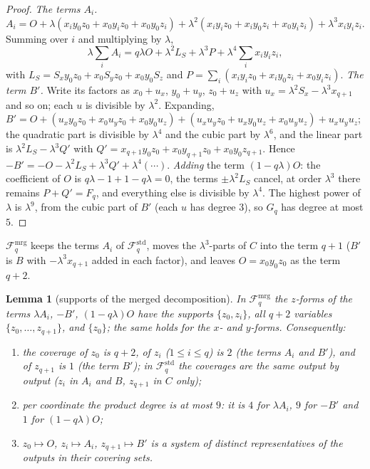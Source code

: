 \documentclass[11pt]{article}
\newtheorem{lemma}[theorem]{Lemma}
\theoremstyle{definition}
\theoremstyle{remark}
\newcommand{\Fstd}{\mathcal{F}^{\mathrm{std}}_q} %
\newcommand{\Fmrg}{\mathcal{F}^{\mathrm{mrg}}_q} %
\newcommand{\Bp}{B'}                          %
\newcommand{\Oterm}{O}                        %
\begin{document}
\begin{proof}
\emph{The terms $A_i$.} $A_i=\Oterm+\lambda(x_iy_0z_0+x_0y_iz_0+x_0y_0z_i)+\lambda^2(x_iy_iz_0+x_iy_0z_i+x_0y_iz_i)+\lambda^3x_iy_iz_i$. Summing over $i$ and multiplying by $\lambda$,
\[
\lambda\sum_iA_i=q\lambda\Oterm+\lambda^2L_S+\lambda^3P+\lambda^4\sum_ix_iy_iz_i,
\]
with $L_S=S_xy_0z_0+x_0S_yz_0+x_0y_0S_z$ and $P=\sum_i(x_iy_iz_0+x_iy_0z_i+x_0y_iz_i)$.
\emph{The term $\Bp$.} Write its factors as $x_0+u_x$, $y_0+u_y$, $z_0+u_z$ with $u_x=\lambda^2S_x-\lambda^3x_{q+1}$ and so on; each $u$ is divisible by $\lambda^2$. Expanding, $\Bp=\Oterm+(u_xy_0z_0+x_0u_yz_0+x_0y_0u_z)+(u_xu_yz_0+u_xy_0u_z+x_0u_yu_z)+u_xu_yu_z$; the quadratic part is divisible by $\lambda^4$ and the cubic part by $\lambda^6$, and the linear part is $\lambda^2L_S-\lambda^3Q'$ with $Q'=x_{q+1}y_0z_0+x_0y_{q+1}z_0+x_0y_0z_{q+1}$. Hence $-\Bp=-\Oterm-\lambda^2L_S+\lambda^3Q'+\lambda^4(\cdots)$.
\emph{Adding} the term $(1-q\lambda)\Oterm$: the coefficient of $\Oterm$ is $q\lambda-1+1-q\lambda=0$, the terms $\pm\lambda^2L_S$ cancel, at order $\lambda^3$ there remains $P+Q'=F_q$, and everything else is divisible by $\lambda^4$. The highest power of $\lambda$ is $\lambda^9$, from the cubic part of $\Bp$ (each $u$ has degree $3$), so $G_q$ has degree at most $5$.
\end{proof}

$\Fmrg$ keeps the terms $A_i$ of $\Fstd$, moves the $\lambda^3$-parts of $C$ into the term $q+1$ ($\Bp$ is $B$ with $-\lambda^3x_{q+1}$ added in each factor), and leaves $\Oterm=x_0y_0z_0$ as the term $q+2$.

\begin{lemma}[supports of the merged decomposition]\label{cp:L2}
In $\Fmrg$ the $z$-forms of the terms $\lambda A_i$, $-\Bp$, $(1-q\lambda)\Oterm$ have the supports $\{z_0,z_i\}$, all $q+2$ variables $\{z_0,\dots,z_{q+1}\}$, and $\{z_0\}$; the same holds for the $x$- and $y$-forms. Consequently:
\begin{enumerate}[label=(\alph*)]
\item the coverage of $z_0$ is $q+2$, of $z_i$ ($1\le i\le q$) is $2$ (the terms $A_i$ and $\Bp$), and of $z_{q+1}$ is $1$ (the term $\Bp$); in $\Fstd$ the coverages are the same output by output ($z_i$ in $A_i$ and $B$, $z_{q+1}$ in $C$ only);
\item per coordinate the product degree is at most $9$: it is $4$ for $\lambda A_i$, $9$ for $-\Bp$ and $1$ for $(1-q\lambda)\Oterm$;
\item $z_0\mapsto\Oterm$, $z_i\mapsto A_i$, $z_{q+1}\mapsto\Bp$ is a system of distinct representatives of the outputs in their covering sets.
\end{enumerate}
\end{lemma}
\end{document}
